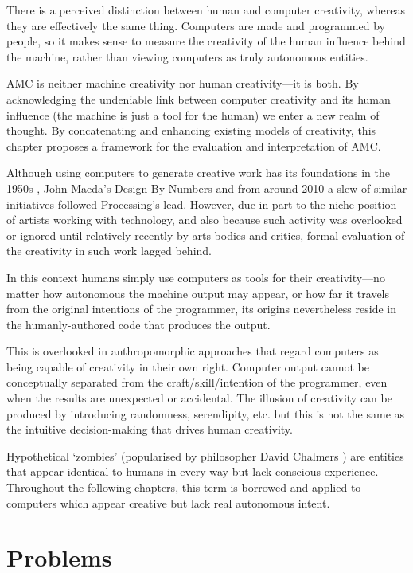 There is a perceived distinction between human and computer creativity, whereas they are effectively the same thing. Computers are made and programmed by people, so it makes sense to measure the creativity of the human influence behind the machine, rather than viewing computers as truly autonomous entities.

\ac{AMC} is neither machine creativity nor human creativity---it is both. By acknowledging the undeniable link between computer creativity and its human influence (the machine is just a tool for the human) we enter a new realm of thought. By concatenating and enhancing existing models of creativity, this chapter proposes a framework for the evaluation and interpretation of \ac{AMC}.

\spirals

Although using computers to generate creative work has its foundations in the 1950s \autocite{Candy2011, Copeland2016}, John Maeda's Design By Numbers \citeyear{Maeda2001} and from around 2010 a slew of similar initiatives followed Processing's lead. However, due in part to the niche position of artists working with technology, and also because such activity was overlooked or ignored until relatively recently by arts bodies and critics, formal evaluation of the creativity in such work lagged behind.

In this context humans simply use computers as tools for their creativity---no matter how autonomous the machine output may appear, or how far it travels from the original intentions of the programmer, its origins nevertheless reside in the humanly-authored code that produces the output.

This is overlooked in anthropomorphic approaches that regard computers as being capable of creativity in their own right. Computer output cannot be conceptually separated from the craft/skill/intention of the programmer, even when the results are unexpected or accidental. The illusion of creativity can be produced by introducing randomness, serendipity, etc. but this is not the same as the intuitive decision-making that drives human creativity.

Hypothetical `zombies' (popularised by philosopher David Chalmers \citeyear{Chalmers1996}) are entities that appear identical to humans in every way but lack conscious experience. Throughout the following chapters, this term is borrowed and applied to computers which appear creative but lack real autonomous intent.


\section{Problems}

